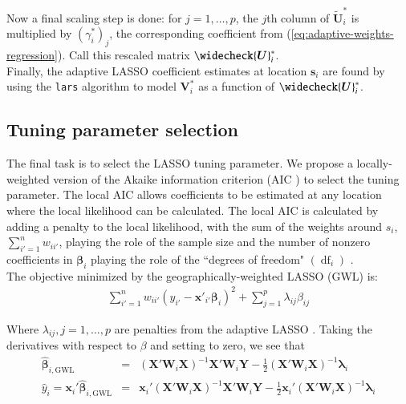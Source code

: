 \documentclass[authoryear, review, 11pt]{elsarticle}
\DeclareMathOperator*{\df}{\mbox{df}}
\begin{document}
	Now a final scaling step is done: for $j=1, \dots, p$, the $j$th column of $\tilde{\bm{U}}_i^*$ is multiplied by $\left(\gamma_i^*\right)_j$, the corresponding coefficient from (\ref{eq:adaptive-weights-regression}). Call this rescaled matrix $\widecheck{\bm{U}}_i^*$.\\
	
	Finally, the adaptive LASSO coefficient estimates at location $\bm{s}_i$ are found by using the \verb!lars! algorithm \citep{Efron:2004b} to model $\bm{V}_i^*$ as a function of $\widecheck{\bm{U}}_i^*$.

	\subsection{Tuning parameter selection}
	The final task is to select the LASSO tuning parameter. We propose a locally-weighted version of the Akaike information criterion (AIC \citep{Akaike:1974}) to select the tuning parameter. The local AIC allows coefficients to be estimated at any location where the local likelihood can be calculated. The local AIC is calculated by adding a penalty to the local likelihood, with the sum of the weights around $s_i$, $\sum_{i'=1}^n w_{ii'}$, playing the role of the sample size and the number of nonzero coefficients in $\bm{\beta}_i$ playing the role of the ``degrees of freedom" $\left( \df_i \right)$ \citep{Zou:2007}.\\
	
	The objective minimized by the geographically-weighted LASSO (GWL) is:	
	\begin{eqnarray}
		\sum_{i'=1}^n w_{ii'} \left(y_{i'} - \bm{x}'_{i'} \bm{\beta}_i \right)^2 + \sum_{j=1}^p \lambda_{ij} \beta_{ij}
	\end{eqnarray}
	
	Where $\lambda_{ij}, j =1, \dots, p$ are penalties from the adaptive LASSO \citep{Zou:2006}. Taking the derivatives with respect to $\beta$ and setting to zero, we see that
	\begin{eqnarray}
		\hat{\bm{\beta}}_{i, \text{GWL}} &=& \left( \bm{X}'\bm{W}_i\bm{X} \right)^{-1}  \bm{X}'\bm{W}_i\bm{Y}  - \frac{1}{2} \left(\bm{X}'\bm{W}_i\bm{X} \right)^{-1} \bm{\lambda}_i\\
		\hat{y}_i = \bm{x}_i' \hat{\bm{\beta}}_{i, \text{GWL}} &=&  \bm{x}_i' \left( \bm{X}'\bm{W}_i\bm{X} \right)^{-1}  \bm{X}'\bm{W}_i\bm{Y}  - \frac{1}{2} \bm{x}_i' \left(\bm{X}'\bm{W}_i\bm{X} \right)^{-1} \bm{\lambda}_i
	\end{eqnarray}
	
\end{document}
